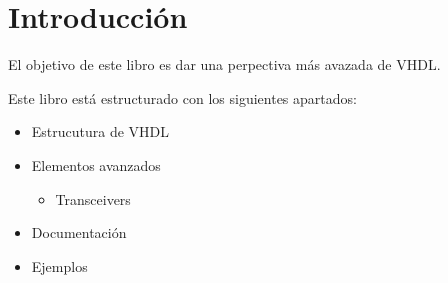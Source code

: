\section*{Introducción}

El objetivo de este libro es dar una perpectiva más avazada de 
VHDL.

Este libro está estructurado con los siguientes apartados:
\begin{itemize}
    \item Estrucutura de VHDL
    \item Elementos avanzados
    \begin{itemize}
        \item Transceivers
    \end{itemize}
    \item Documentación
    \item Ejemplos
\end{itemize}